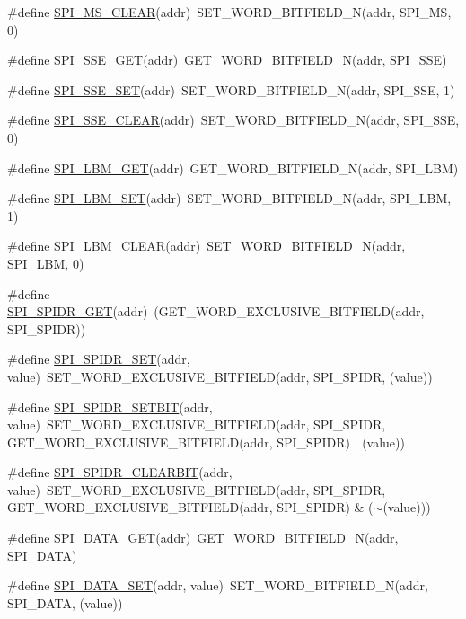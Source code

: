 \begin{DoxyCompactItemize}
\item 
\#define \hyperlink{a00572_a3f3cd4a27a9177c8d89336d88ec9e487}{SPI\_\-MS\_\-CLEAR}(addr)~SET\_\-WORD\_\-BITFIELD\_\-N(addr, SPI\_\-MS, 0)
\item 
\#define \hyperlink{a00572_a7f6f9507f5aba07562fad63496bac10b}{SPI\_\-SSE\_\-GET}(addr)~GET\_\-WORD\_\-BITFIELD\_\-N(addr, SPI\_\-SSE)
\item 
\#define \hyperlink{a00572_a718462dcab8a91c013ca8898d3e16288}{SPI\_\-SSE\_\-SET}(addr)~SET\_\-WORD\_\-BITFIELD\_\-N(addr, SPI\_\-SSE, 1)
\item 
\#define \hyperlink{a00572_a1a0bc792b67636697ad88cdce4097664}{SPI\_\-SSE\_\-CLEAR}(addr)~SET\_\-WORD\_\-BITFIELD\_\-N(addr, SPI\_\-SSE, 0)
\item 
\#define \hyperlink{a00572_aeb6b5309e04d25d6130aab101f61961b}{SPI\_\-LBM\_\-GET}(addr)~GET\_\-WORD\_\-BITFIELD\_\-N(addr, SPI\_\-LBM)
\item 
\#define \hyperlink{a00572_a7ce25f661ad5c72747ec6fcbec7681c0}{SPI\_\-LBM\_\-SET}(addr)~SET\_\-WORD\_\-BITFIELD\_\-N(addr, SPI\_\-LBM, 1)
\item 
\#define \hyperlink{a00572_ab20f56c669d1df442565ebd911eae8ff}{SPI\_\-LBM\_\-CLEAR}(addr)~SET\_\-WORD\_\-BITFIELD\_\-N(addr, SPI\_\-LBM, 0)
\item 
\#define \hyperlink{a00572_a4096ab42cbe53b7da061ee49a47a5b75}{SPI\_\-SPIDR\_\-GET}(addr)~(GET\_\-WORD\_\-EXCLUSIVE\_\-BITFIELD(addr, SPI\_\-SPIDR))
\item 
\#define \hyperlink{a00572_abdf8fa70af7624d4a81048a99d631f87}{SPI\_\-SPIDR\_\-SET}(addr, value)~SET\_\-WORD\_\-EXCLUSIVE\_\-BITFIELD(addr, SPI\_\-SPIDR, (value))
\item 
\#define \hyperlink{a00572_af6781c705e682db5dad9497df9ce9bfc}{SPI\_\-SPIDR\_\-SETBIT}(addr, value)~SET\_\-WORD\_\-EXCLUSIVE\_\-BITFIELD(addr, SPI\_\-SPIDR, GET\_\-WORD\_\-EXCLUSIVE\_\-BITFIELD(addr, SPI\_\-SPIDR) $|$ (value))
\item 
\#define \hyperlink{a00572_a4467693908c9deb8cef2df5792cdfdf9}{SPI\_\-SPIDR\_\-CLEARBIT}(addr, value)~SET\_\-WORD\_\-EXCLUSIVE\_\-BITFIELD(addr, SPI\_\-SPIDR, GET\_\-WORD\_\-EXCLUSIVE\_\-BITFIELD(addr, SPI\_\-SPIDR) \& ($\sim$(value)))
\item 
\#define \hyperlink{a00572_a4fc645a0345a6900e6f546e0b3f4d4ec}{SPI\_\-DATA\_\-GET}(addr)~GET\_\-WORD\_\-BITFIELD\_\-N(addr, SPI\_\-DATA)
\item 
\#define \hyperlink{a00572_a03f3d8680e1aeb464fddbb56d81d01c1}{SPI\_\-DATA\_\-SET}(addr, value)~SET\_\-WORD\_\-BITFIELD\_\-N(addr, SPI\_\-DATA, (value))

\end{DoxyCompactItemize}
